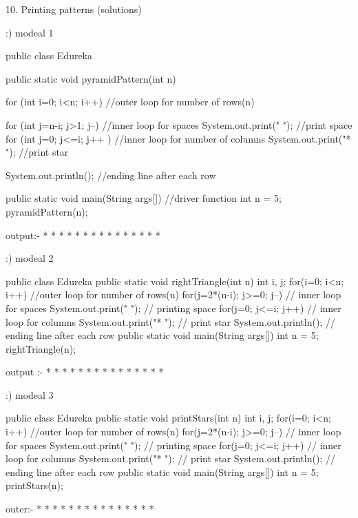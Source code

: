 10. Printing patterns (solutions)

:) modeal 1

public class Edureka
{  
    public static void pyramidPattern(int n) 
    {  
        for (int i=0; i<n; i++) //outer loop for number of rows(n) { for (int j=n-i; j>1; j--) //inner loop for spaces
            { 
                System.out.print(" "); //print space
            }  
            for (int j=0; j<=i; j++ ) //inner loop for number of columns
            { 
                System.out.print("* "); //print star
            } 
  
            System.out.println(); //ending line after each row
        } 
    } 
  
    public static void main(String args[]) //driver function
    { 
        int n = 5; 
        pyramidPattern(n); 
    } 
}
 output:-
    * 
   * * 
  * * * 
 * * * * 
* * * * *



:) modeal 2


public class Edureka 
{ 
    public static void rightTriangle(int n) 
    { 
        int i, j;  
        for(i=0; i<n; i++) //outer loop for number of rows(n) { for(j=2*(n-i); j>=0; j--) // inner loop for spaces 
            {           
                System.out.print(" "); // printing space
            } 
            for(j=0; j<=i; j++) //  inner loop for columns
            {       
                System.out.print("* "); // print star
            }           
            System.out.println(); // ending line after each row
        } 
    } 
    public static void main(String args[]) 
    { 
        int n = 5; 
        rightTriangle(n); 
    } 
}

output :-
*
* *
* * *
* * * *
* * * * *


:) modeal 3

public class Edureka 
{ 
    public static void printStars(int n) 
    { 
        int i, j;  
        for(i=0; i<n; i++) //outer loop for number of rows(n) { for(j=2*(n-i); j>=0; j--) // inner loop for spaces 
            {           
                System.out.print(" "); // printing space
            } 
            for(j=0; j<=i; j++) //  inner loop for columns
            {       
                System.out.print("* "); // print star
            }           
            System.out.println(); // ending line after each row
        } 
    } 
    public static void main(String args[]) 
    { 
        int n = 5; 
        printStars(n); 
    } 
}

outer:-
		   * 
         * * 
       * * * 
     * * * * 
   * * * * * 

